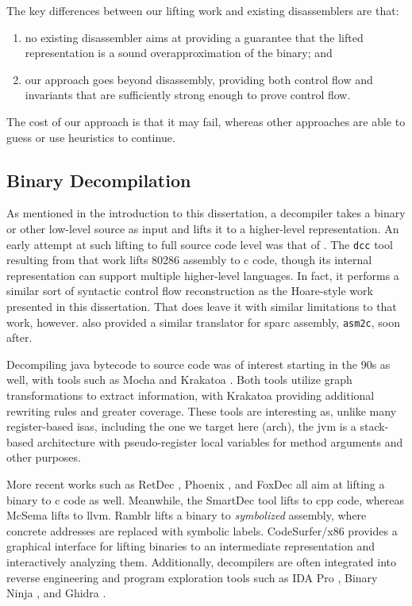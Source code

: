 The key differences between our lifting work and existing disassemblers are that:
\begin{enumerate}
  \item no existing disassembler aims at providing a guarantee that the lifted representation is a sound overapproximation of the binary; and
  \item our approach goes beyond disassembly, providing both control flow and invariants that are sufficiently strong enough to prove control flow.
\end{enumerate}
The cost of our approach is that it may fail, whereas other approaches are able to guess or use heuristics to continue.

\subsection{Binary Decompilation}\label{related-decompilation}
As mentioned in the introduction to this dissertation, a decompiler takes a binary or other low-level source as input and lifts it to a higher-level representation.
An early attempt at such lifting to full source code level was that of \textcite{cifuentes1995decompilation}.
The \lstinline|dcc| tool resulting from that work lifts \gls{80286} assembly to \gls{c} code, though its internal representation can support multiple higher-level languages.
In fact, it performs a similar sort of syntactic control flow reconstruction as the Hoare-style work presented in this dissertation.
That does leave it with similar limitations to that work, however.
\Textcite{cifuentes1998assembly} also provided a similar translator for \gls{sparc} assembly, \lstinline|asm2c|, soon after.

Decompiling \gls{java} bytecode to source code was of interest starting in the 90s as well, with tools such as Mocha \autocite{mocha} and Krakatoa \autocite{proebsting1997krakatoa}.
Both tools utilize graph transformations to extract information, with Krakatoa providing additional rewriting rules and greater coverage.
These tools are interesting as, unlike many register-based \glspl{isa}, including the one we target here (\gls{arch}), the \gls{jvm} is a stack-based architecture with pseudo-register local variables for method arguments and other purposes.

More recent works such as RetDec \autocite{retdec}, Phoenix \autocite{brumley2013native}, and FoxDec \autocite{verbeek2020sound} all aim at lifting a binary to \gls{c} code as well.
Meanwhile, the SmartDec tool \autocite{fokin2011smartdec} lifts to \gls{cpp} code, whereas McSema \autocite{dinaburg2014mcsema} lifts to \gls{llvm}.
Ramblr \autocite{wang2017ramblr} lifts a binary to \emph{symbolized} assembly, where concrete addresses are replaced with symbolic labels.
CodeSurfer/\gls{x86} \autocite{balakrishnan2004analyzing,balakrishnan2005codesurfer}
provides a graphical interface for lifting binaries to an intermediate representation and interactively analyzing them.
Additionally, decompilers are often integrated into reverse engineering and program exploration tools such as IDA Pro \autocite{ida-decompiler},
Binary Ninja \autocite{binary-ninja-decompiler}, and Ghidra \autocite{ghidra}.

